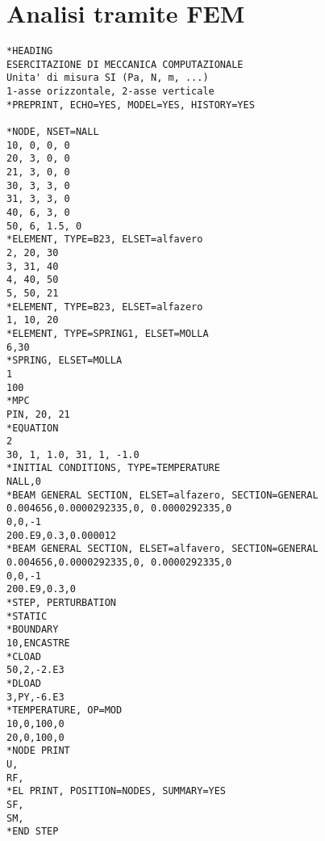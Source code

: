 \section{Analisi tramite FEM}
\begin{lstlisting} 
*HEADING
ESERCITAZIONE DI MECCANICA COMPUTAZIONALE
Unita' di misura SI (Pa, N, m, ...)
1-asse orizzontale, 2-asse verticale
*PREPRINT, ECHO=YES, MODEL=YES, HISTORY=YES

*NODE, NSET=NALL
10, 0, 0, 0
20, 3, 0, 0
21, 3, 0, 0
30, 3, 3, 0
31, 3, 3, 0
40, 6, 3, 0
50, 6, 1.5, 0
*ELEMENT, TYPE=B23, ELSET=alfavero
2, 20, 30
3, 31, 40
4, 40, 50
5, 50, 21
*ELEMENT, TYPE=B23, ELSET=alfazero
1, 10, 20
*ELEMENT, TYPE=SPRING1, ELSET=MOLLA
6,30
*SPRING, ELSET=MOLLA
1
100
*MPC
PIN, 20, 21
*EQUATION 
2 
30, 1, 1.0, 31, 1, -1.0
*INITIAL CONDITIONS, TYPE=TEMPERATURE
NALL,0
*BEAM GENERAL SECTION, ELSET=alfazero, SECTION=GENERAL
0.004656,0.0000292335,0, 0.0000292335,0
0,0,-1
200.E9,0.3,0.000012
*BEAM GENERAL SECTION, ELSET=alfavero, SECTION=GENERAL
0.004656,0.0000292335,0, 0.0000292335,0
0,0,-1
200.E9,0.3,0
*STEP, PERTURBATION
*STATIC
*BOUNDARY
10,ENCASTRE
*CLOAD
50,2,-2.E3
*DLOAD
3,PY,-6.E3
*TEMPERATURE, OP=MOD
10,0,100,0
20,0,100,0
*NODE PRINT
U,
RF,
*EL PRINT, POSITION=NODES, SUMMARY=YES
SF,
SM,
*END STEP
\end{lstlisting}